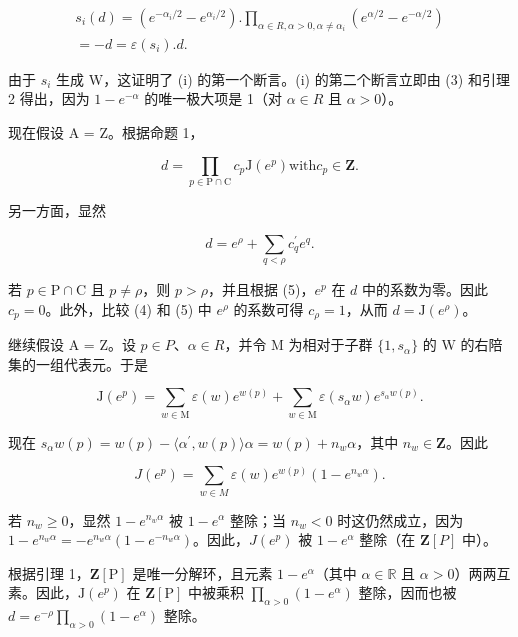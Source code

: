 \[
\begin{array}{l} s _ {i} (d) = (e ^ {- \alpha_ {i} / 2} - e ^ {\alpha_ {i} / 2}). \prod_ {\alpha \in R, \alpha > 0, \alpha \neq \alpha_ {i}} (e ^ {\alpha / 2} - e ^ {- \alpha / 2}) \\ = - d = \varepsilon (s _ {i}). d. \end{array}
\]

由于 \(s_{i}\) 生成 W，这证明了 (i) 的第一个断言。(i) 的第二个断言立即由 (3) 和引理 2 得出，因为 \(1 - e^{-\alpha}\) 的唯一极大项是 1（对 \(\alpha \in R\) 且 \(\alpha > 0\)）。

现在假设 A = Z。根据命题 1，

\[
d = \prod_ {p \in \mathrm{P} \cap \mathrm{C}} c _ {p} \mathrm{J} (e ^ {p}) \text {with} c _ {p} \in \mathbf {Z}.\tag{4}
\]

另一方面，显然

\[
d = e ^ {\rho} + \sum_ {q <   \rho} c _ {q} ^ {\prime} e ^ {q}.\tag{5}
\]

若 \(p \in \mathrm{P} \cap \mathrm{C}\) 且 \(p \neq \rho\)，则 \(p > \rho\)，并且根据 (5)，\(e^p\) 在 \(d\) 中的系数为零。因此 \(c_p = 0\)。此外，比较 (4) 和 (5) 中 \(e^\rho\) 的系数可得 \(c_\rho = 1\)，从而 \(d = \mathrm{J}(e^\rho)\)。

继续假设 A = Z。设 \(p \in P\)、\(\alpha \in R\)，并令 M 为相对于子群 \(\{1, s_{\alpha}\}\) 的 W 的右陪集的一组代表元。于是

\[
\mathrm{J} (e ^ {p}) = \sum_ {w \in \mathrm{M}} \varepsilon (w) e ^ {w (p)} + \sum_ {w \in \mathrm{M}} \varepsilon (s _ {\alpha} w) e ^ {s _ {\alpha} w (p)}.
\]

现在 \(s_{\alpha}w(p) = w(p) - \langle \alpha^{\prime},w(p)\rangle \alpha = w(p) + n_w\alpha\)，其中 \(n_w\in \mathbf{Z}\)。因此

\[
J (e ^ {p}) = \sum_ {w \in M} \varepsilon (w) e ^ {w (p)} \left(1 - e ^ {n _ {w} \alpha}\right).
\]

若 \(n_w \geqslant 0\)，显然 \(1 - e^{n_w\alpha}\) 被 \(1 - e^\alpha\) 整除；当 \(n_w < 0\) 时这仍然成立，因为 \(1 - e^{n_w\alpha} = -e^{n_w\alpha}(1 - e^{-n_w\alpha})\)。因此，\(J(e^p)\) 被 \(1 - e^\alpha\) 整除（在 \(\mathbf{Z}[P]\) 中）。

根据引理 1，\(\mathbf{Z}[\mathrm{P}]\) 是唯一分解环，且元素 \(1 - e^{\alpha}\)（其中 \(\alpha \in \mathbb{R}\) 且 \(\alpha > 0\)）两两互素。因此，\(\mathrm{J}(e^{p})\) 在 \(\mathbf{Z}[\mathrm{P}]\) 中被乘积 \(\prod_{\alpha > 0}(1 - e^{\alpha})\) 整除，因而也被 \(d = e^{-\rho}\prod_{\alpha > 0}(1 - e^{\alpha})\) 整除。

